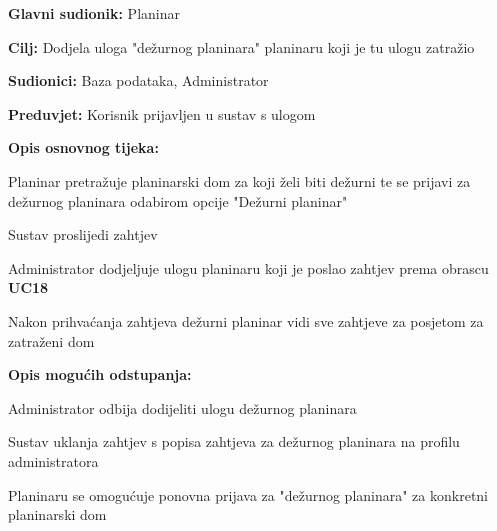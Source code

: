		\noindent {}
		\begin{packed_item}
			
			\item \textbf{Glavni sudionik: }$ $Planinar$ $
			\item  \textbf{Cilj:} $ $Dodjela uloga "dežurnog planinara" planinaru koji je tu ulogu zatražio$ $
			\item  \textbf{Sudionici:} $ $Baza podataka, Administrator$ $
			\item  \textbf{Preduvjet:} $ $Korisnik prijavljen u sustav s ulogom $ $ 
			\item  \textbf{Opis osnovnog tijeka:}
			
			\item[] \begin{packed_enum}
				
				\item $ $Planinar pretražuje planinarski dom za koji želi biti dežurni te se prijavi za dežurnog planinara odabirom opcije "Dežurni planinar"$ $
				\item $ $Sustav proslijedi zahtjev $ $
				\item $ $Administrator dodjeljuje ulogu  planinaru koji je poslao zahtjev prema obrascu \textbf{UC18}$ $
				\item $ $Nakon prihvaćanja zahtjeva dežurni planinar vidi sve zahtjeve za posjetom za zatraženi dom$ $
			\end{packed_enum}
		\item  \textbf{Opis mogućih odstupanja:}
		
		\item[] \begin{packed_item}
			
			\item[3.a] $ $Administrator odbija dodijeliti ulogu dežurnog planinara$ $
			\item[] \begin{packed_enum}
				\item $ $Sustav uklanja zahtjev s popisa zahtjeva za dežurnog planinara na profilu administratora$ $
				\item $ $Planinaru se omogućuje ponovna prijava za "dežurnog planinara" za konkretni planinarski dom $ $
			\end{packed_enum}
		\end{packed_item}
		\end{packed_item}
	
